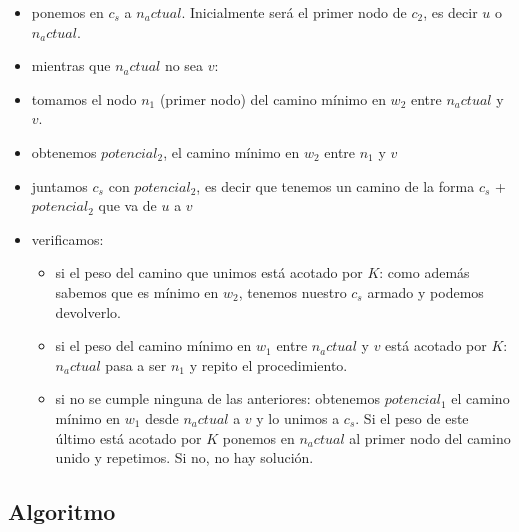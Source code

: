 \begin{itemize}
\item ponemos en $c_s$ a $n_actual$. Inicialmente ser\'a el primer nodo de $c_2$, es decir $u$ o $n_actual$.
\item mientras que $n_actual$ no sea $v$:
\item tomamos el nodo $n_1$ (primer nodo) del camino m\'inimo en $w_2$ entre $n_actual$ y $v$.
\item obtenemos $potencial_2$, el camino m\'inimo en $w_2$ entre $n_1$ y $v$
\item juntamos $c_s$ con $potencial_2$, es decir que tenemos un camino de la forma $c_s$ + $potencial_2$ que va de $u$ a $v$
\item verificamos:
\begin{itemize}
	\item si el peso del camino que unimos est\'a acotado por $K$: como adem\'as sabemos que es m\'inimo en $w_2$, tenemos nuestro $c_s$ armado y podemos devolverlo.
	\item si el peso del camino m\'inimo en $w_1$ entre $n_actual$ y $v$ est\'a acotado por $K$: $n_actual$ pasa a ser $n_1$ y repito el procedimiento.  
	\item si no se cumple ninguna de las anteriores: obtenemos $potencial_1$ el camino m\'inimo en $w_1$ desde $n_actual$ a $v$ y lo unimos a $c_s$. Si el peso de este \'ultimo est\'a acotado por $K$ ponemos en $n_actual$ al primer nodo del camino unido y repetimos. Si no, no hay soluci\'on.
\end{itemize}
\end{itemize}

\newpage
\subsection{Algoritmo}